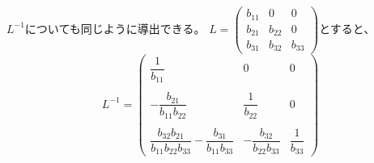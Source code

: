 \documentclass[titlepage]{jsarticle}
\begin{document}
		$L^{-1}$についても同じように導出できる。
		$\displaystyle
	             L = \left(
	                \begin{array}{ccc}
	                    b_{11} & 0 & 0 \\
	                    b_{21} & b_{22} & 0 \\
	                    b_{31} & b_{32} & b_{33}
	                \end{array}
	            \right)
		$とすると、
		\begin{equation}
	            	L^{-1} =
			\left(
			\begin{array}{ccc}
	                    \dfrac{1}{b_{11}} & 0 & 0 \\
					& & \\
	                    -\dfrac{b_{21}}{b_{11}b_{22}} & \dfrac{1}{b_{22}} & 0 \\
					& & \\
	                    \dfrac{b_{32}b_{21}}{b_{11}b_{22}b_{33}} - \dfrac{b_{31}}{b_{11}b_{33}} & -\dfrac{b_{32}}{b_{22}b_{33}} &
				 \dfrac{1}{b_{33}}
	                \end{array}
	            \right)\nonumber
		\end{equation}
\end{document}
